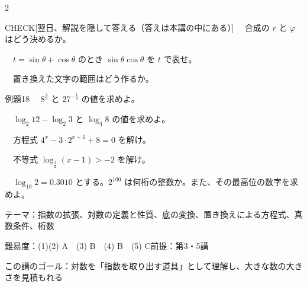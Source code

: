 \documentclass[paper=b5j, fontsize=8pt, fleqn, twoside]{jlreq}
\begin{document}
\begin{multicols*}{2}
  \begin{ptbs}{CHECK}[翌日、解説を隠して答える（答えは本講の中にある）]
    　合成の $r$ と $\varphi$ はどう決めるか。\par
    　$t=\sin\theta+\cos\theta$ のとき $\sin\theta\cos\theta$ を $t$ で表せ。\par
    　置き換えた文字の範囲はどう作るか。
  \end{ptbs}

  \notefill
\end{multicols*}
\begin{ascolorbox4A}[出典：オリジナル]{例題18}
  　$8^{\frac23}$ と $27^{-\frac13}$ の値を求めよ。\par
  　$\log_2 12-\log_2 3$ と $\log_4 8$ の値を求めよ。\par
  　方程式 $4^x-3\cdot2^{x+1}+8=0$ を解け。\par
  　不等式 $\log_{\frac12}(x-1)>-2$ を解け。\par
  　$\log_{10}2=0.3010$ とする。$2^{100}$ は何桁の整数か。また、その最高位の数字を求めよ。
\end{ascolorbox4A}

\begin{Data}
  テーマ：指数の拡張、対数の定義と性質、底の変換、置き換えによる方程式、真数条件、桁数\par
  難易度：(1)(2) A　(3) B　(4) B　(5) C\quad 前提：第3・5講\par
  この講のゴール：対数を「指数を取り出す道具」として理解し、大きな数の大きさを見積もれる
\end{Data}
\end{document}
